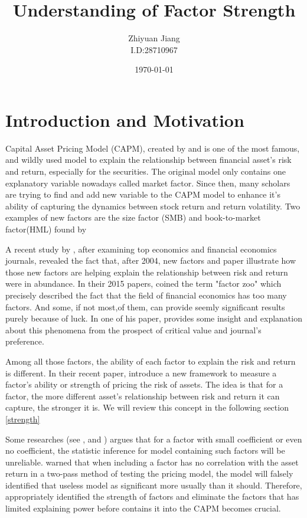 \documentclass[12pt]{article}
\title{Understanding of Factor Strength}
\author{Zhiyuan Jiang\\I.D:28710967}
\date{\today}
\begin{document}
	\maketitle	
	\newpage
	\tableofcontents
	\newpage
	\section{Introduction and Motivation} \label{Intro}
Capital Asset Pricing Model (CAPM), created by  and  is one of the most famous, and wildly used model to explain the relationship between financial asset's risk and return, especially for the securities.  
The original model only contains one explanatory variable nowadays called market factor. 
Since then, many scholars are trying to find and add new variable to the CAPM model to enhance it's ability of capturing the dynamics  between stock return and return volatility. 
Two examples of new factors are the size factor (SMB) and book-to-market factor(HML) found by  

A recent study by , after examining top economics and financial economics journals, revealed the fact that, after 2004, new factors and paper illustrate how those new factors are helping explain the relationship between risk and return were in abundance.
In their 2015 papers, \citeauthor{Harvey2015}  coined the term "factor zoo" which precisely described the fact that the field of financial economics has too many factors. And some, if not most,of them, can provide seemly significant results purely because of luck. In one of his paper,  provides some insight and explanation about this phenomena from the prospect of critical value and journal's preference. %

Among all those factors, the ability of each factor to explain the risk and return is different. 
In their recent paper, \cite{Bailey2020} introduce a new framework to measure a factor's ability or strength of pricing the risk of  assets.
The idea is that for a factor, the more different asset's relationship between risk and return it can capture, the stronger it is.
We will review this concept in the following section \ref{strength}

Some researches (see , and ) argues that for a factor with small coefficient or even no coefficient, the statistic inference for model containing such factors will be unreliable.
 warned that when including a factor has no correlation with the asset return in a two-pass method of testing the pricing model, the model will falsely identified that useless model as significant more usually than it should. 
Therefore, appropriately identified the  strength of factors and eliminate the factors that has limited explaining power before contains it into the CAPM becomes crucial.
\end{document}

